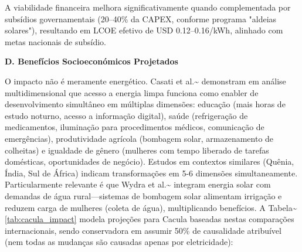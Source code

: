 \documentclass[12pt, a4paper]{article}
\begin{document}
A viabilidade financeira melhora significativamente quando complementada por subsídios governamentais (20--40\% da CAPEX, conforme programa "aldeias solares"), resultando em LCOE efetivo de USD 0.12--0.16/kWh, alinhado com metas nacionais de subsídio.

\textbf{D. Benefícios Socioeconómicos Projetados}

O impacto não é meramente energético. Casati et al.\textasciitilde{}\citep{Casati2023} demonstram em análise multidimensional que acesso a energia limpa funciona como enabler de desenvolvimento simultâneo em múltiplas dimensões: educação (mais horas de estudo noturno, acesso a informação digital), saúde (refrigeração de medicamentos, iluminação para procedimentos médicos, comunicação de emergências), produtividade agrícola (bombagem solar, armazenamento de colheitas) e igualdade de gênero (mulheres com tempo liberado de tarefas domésticas, oportunidades de negócio). Estudos em contextos similares (Quênia, Índia, Sul de África) indicam transformações em 5-6 dimensões simultaneamente. Particularmente relevante é que Wydra et al.\textasciitilde{}\citep{Wydra2019} integram energia solar com demandas de água rural—sistemas de bombagem solar alimentam irrigação e reduzem carga de mulheres (coleta de água), multiplicando benefícios. A Tabela\textasciitilde{}\ref{tab:cacula_impact} modela projeções para Cacula baseadas nestas comparações internacionais, sendo conservadora em assumir 50\% de causalidade atribuível (nem todas as mudanças são causadas apenas por eletricidade):
\end{document}

